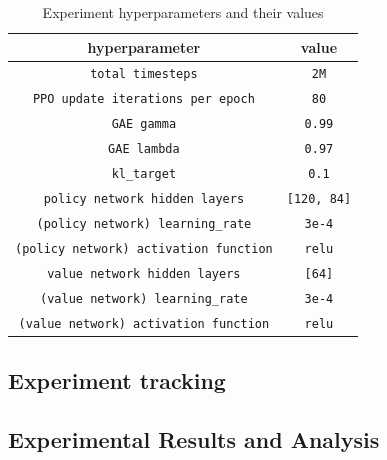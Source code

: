 \begin{table}
  \begin{center}
    \begin{tabular}{cc}
      \hline 
      hyperparameter & value \\ 
      \hline 
      \verb!total timesteps! & \verb!2M! \\
      \verb!PPO update iterations per epoch! &  \verb!80! \\
      \verb!GAE gamma! & \verb!0.99! \\
      \verb!GAE lambda! & \verb!0.97! \\
      \verb!kl_target! & \verb!0.1! \\
      \verb!policy network hidden layers! & \verb![120, 84]! \\
      \verb!(policy network) learning_rate! & \verb!3e-4! \\
      \verb!(policy network) activation function! & \verb!relu!\\
      \verb!value network hidden layers! & \verb![64]! \\
      \verb!(value network) learning_rate! & \verb!3e-4! \\
      \verb!(value network) activation function! & \verb!relu! \\
      \hline      
    \end{tabular}
  \end{center}
  \caption{Experiment hyperparameters and their values}
  \label{hyperparameters}
\end{table}




\subsection{Experiment tracking}
 




\subsection{Experimental Results and Analysis}

